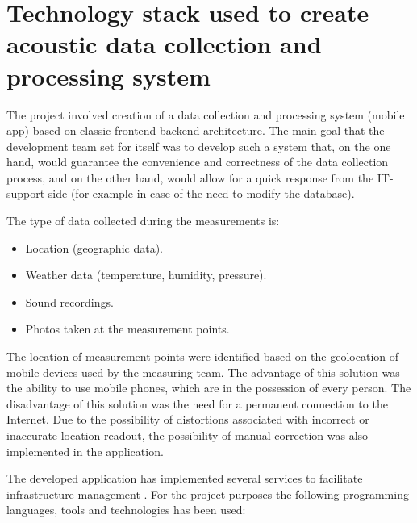 \documentclass[a4paper,10pt]{article}
\begin{document}
\section{Technology stack used to create acoustic data collection and processing system}

\begin{multicols}{2}

  The project involved creation of a data collection and processing system
  (mobile app) based on classic frontend-backend architecture. The main goal
  that the development team set for itself was to develop such a system that, on
  the one hand, would guarantee the convenience and correctness of the data
  collection process, and on the other hand, would allow for a quick response
  from the IT-support side (for example in case of the need to modify the
  database).

  The type of data collected during the measurements is:
  \begin{itemize}
    \item Location (geographic data).
    \item Weather data (temperature, humidity, pressure).
    \item Sound recordings.
    \item Photos taken at the measurement points.
  \end{itemize}

  The location of measurement points were identified based on the geolocation of
  mobile devices used by the measuring team. The advantage of this solution was
  the ability to use mobile phones, which are in the possession of every person.
  The disadvantage of this solution was the need for a permanent connection to
  the Internet. Due to the possibility of distortions associated with incorrect
  or inaccurate location readout, the possibility of manual correction was also
  implemented in the application.

  The developed application has implemented several services to facilitate
  infrastructure management \cite{burns2019kubernetes}. For the project purposes
  the following programming languages, tools and technologies has been used:


\end{multicols}
\end{document}
